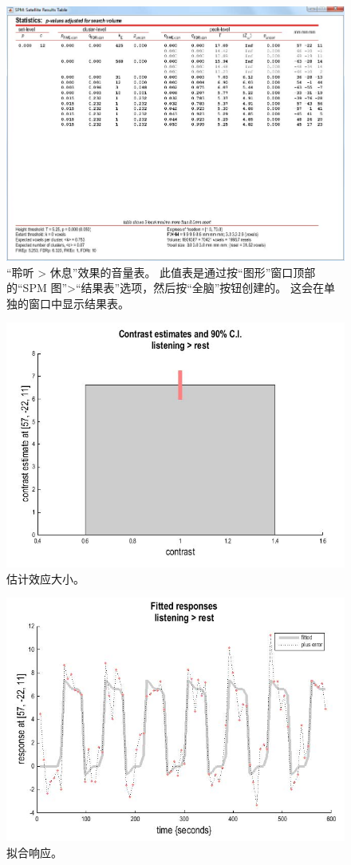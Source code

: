 \begin{figure}[htbp]
	\centering
	\includegraphics[width=0.6\linewidth]{part7/figs/fig_30_15}
	\caption{“聆听 > 休息”效果的音量表。 此值表是通过按“图形”窗口顶部的“SPM 图”>“结果表”选项，然后按“全脑”按钮创建的。 这会在单独的窗口中显示结果表。}
	\label{fig_30_15}
\end{figure}

\begin{figure}[htbp]
	\centering
	\includegraphics[width=0.6\linewidth]{part7/figs/fig_30_16}
	\caption{估计效应大小。}
	\label{fig_30_16}
\end{figure}

\begin{figure}[htbp]
	\centering
	\includegraphics[width=0.6\linewidth]{part7/figs/fig_30_17}
	\caption{拟合响应。}
	\label{fig_30_17}
\end{figure}

